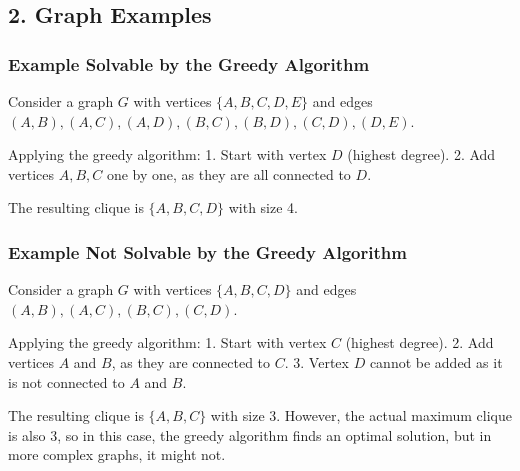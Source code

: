 \documentclass{article}
\begin{document}
\subsection*{2. Graph Examples}

\subsubsection*{Example Solvable by the Greedy Algorithm}
Consider a graph \( G \) with vertices \( \{A, B, C, D, E\} \) and edges \((A, B), (A, C), (A, D), (B, C), (B, D), (C, D), (D, E)\).

\begin{center}
\end{center}

Applying the greedy algorithm:
1. Start with vertex \( D \) (highest degree).
2. Add vertices \( A, B, C \) one by one, as they are all connected to \( D \).

The resulting clique is \( \{A, B, C, D\} \) with size 4.

\subsubsection*{Example Not Solvable by the Greedy Algorithm}
Consider a graph \( G \) with vertices \( \{A, B, C, D\} \) and edges \((A, B), (A, C), (B, C), (C, D)\).

\begin{center}
\end{center}

Applying the greedy algorithm:
1. Start with vertex \( C \) (highest degree).
2. Add vertices \( A \) and \( B \), as they are connected to \( C \).
3. Vertex \( D \) cannot be added as it is not connected to \( A \) and \( B \).

The resulting clique is \( \{A, B, C\} \) with size 3. However, the actual maximum clique is also 3, so in this case, the greedy algorithm finds an optimal solution, but in more complex graphs, it might not.
\end{document}
